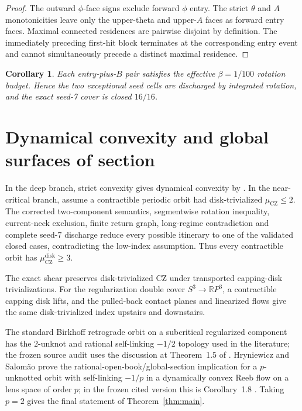 \documentclass[11pt]{article}
\newtheorem{corollary}[theorem]{Corollary}
\newcommand{\CZ}{\mu_{\mathrm{CZ}}}
\newcommand{\RP}{\mathbb{R}P}
\begin{document}
\begin{proof}
The outward $\phi$-face signs exclude forward $\phi$ entry. The strict $\theta$ and $A$ monotonicities leave only the upper-theta and upper-$A$ faces as forward entry faces. Maximal connected residences are pairwise disjoint by definition. The immediately preceding first-hit block terminates at the corresponding entry event and cannot simultaneously precede a distinct maximal residence.
\end{proof}

\begin{corollary}
Each entry-plus-$B$ pair satisfies the effective $\beta=1/100$ rotation budget. Hence the two exceptional seed cells are discharged by integrated rotation, and the exact seed-7 cover is closed $16/16$.
\end{corollary}

\section{Dynamical convexity and global surfaces of section}
In the deep branch, strict convexity gives dynamical convexity by \citep{HWZ1998}. In the near-critical branch, assume a contractible periodic orbit had disk-trivialized $\CZ\le2$. The corrected two-component semantics, segmentwise rotation inequality, current-neck exclusion, finite return graph, long-regime contradiction and complete seed-7 discharge reduce every possible itinerary to one of the validated closed cases, contradicting the low-index assumption. Thus every contractible orbit has $\CZ^{\mathrm{disk}}\ge3$.

The exact shear preserves disk-trivialized CZ under transported capping-disk trivializations. For the regularization double cover $S^3\to\RP^3$, a contractible capping disk lifts, and the pulled-back contact planes and linearized flows give the same disk-trivialized index upstairs and downstairs.

The standard Birkhoff retrograde orbit on a subcritical regularized component has the $2$-unknot and rational self-linking $-1/2$ topology used in the literature; the frozen source audit uses the discussion at Theorem~1.5 of \citet{LiuSalomao2025}. Hryniewicz and Salom\~ao prove the rational-open-book/global-section implication for a $p$-unknotted orbit with self-linking $-1/p$ in a dynamically convex Reeb flow on a lens space of order $p$; in the frozen cited version this is Corollary~1.8 \citep{HryniewiczSalomao2016}. Taking $p=2$ gives the final statement of Theorem~\ref{thm:main}.
\end{document}

